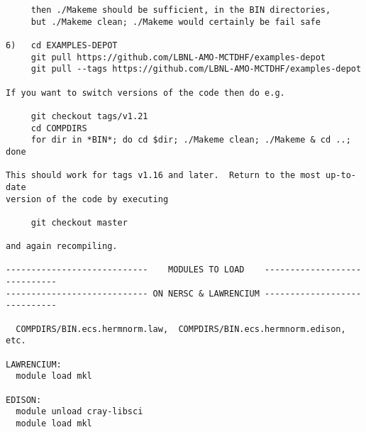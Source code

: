 \begin{verbatim}
     then ./Makeme should be sufficient, in the BIN directories,
     but ./Makeme clean; ./Makeme would certainly be fail safe

6)   cd EXAMPLES-DEPOT
     git pull https://github.com/LBNL-AMO-MCTDHF/examples-depot
     git pull --tags https://github.com/LBNL-AMO-MCTDHF/examples-depot

If you want to switch versions of the code then do e.g.

     git checkout tags/v1.21
     cd COMPDIRS
     for dir in *BIN*; do cd $dir; ./Makeme clean; ./Makeme & cd ..; done

This should work for tags v1.16 and later.  Return to the most up-to-date 
version of the code by executing

     git checkout master

and again recompiling.

----------------------------    MODULES TO LOAD    -----------------------------
---------------------------- ON NERSC & LAWRENCIUM -----------------------------

  COMPDIRS/BIN.ecs.hermnorm.law,  COMPDIRS/BIN.ecs.hermnorm.edison, etc.

LAWRENCIUM:
  module load mkl

EDISON:
  module unload cray-libsci
  module load mkl
\end{verbatim}
